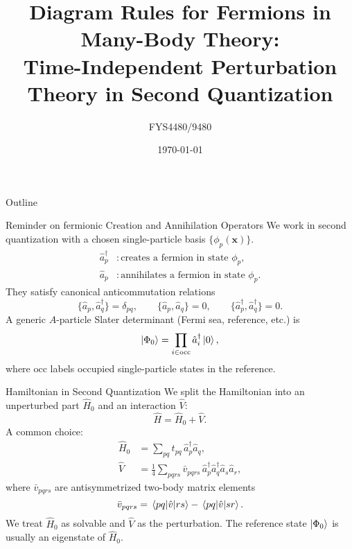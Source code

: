 \documentclass[aspectratio=169]{beamer}
\title[Diagram Rules for Fermions]{Diagram Rules for Fermions in Many-Body Theory:\\
Time-Independent Perturbation Theory in Second Quantization}
\author{FYS4480/9480}
\institute{Addition to lecture notes week 44}
\date{\today}
\begin{document}

\begin{frame}
    \titlepage
\end{frame}

\begin{frame}{Outline}
\tableofcontents
\end{frame}



\begin{frame}{Reminder on fermionic Creation and Annihilation Operators}
We work in second quantization with a chosen single-particle basis
$\{ \phi_p(\mathbf{x}) \}$.
\begin{align}
    \hat{a}^\dagger_p &: \text{creates a fermion in state } \phi_p, \\
    \hat{a}_p &: \text{annihilates a fermion in state } \phi_p.
\end{align}
They satisfy canonical anticommutation relations
\begin{equation}
    \{ \hat{a}_p, \hat{a}_q^\dagger \} = \delta_{pq}, \qquad
    \{ \hat{a}_p, \hat{a}_q \} = 0, \qquad
    \{ \hat{a}^\dagger_p, \hat{a}^\dagger_q \} = 0.
\end{equation}
A generic $A$-particle Slater determinant (Fermi sea, reference, etc.) is
\begin{equation}
    \ket{\Phi_0} = \prod_{i \in \text{occ}} \hat{a}^\dagger_i \ket{0},
\end{equation}
where $\text{occ}$ labels occupied single-particle states in the reference.
\end{frame}

\begin{frame}{Hamiltonian in Second Quantization}
We split the Hamiltonian into an unperturbed part $\hat{H}_0$ and an interaction $\hat{V}$:
\begin{equation}
    \hat{H} = \hat{H}_0 + \hat{V}.
\end{equation}
A common choice:
\begin{align}
    \hat{H}_0 &= \sum_{pq} t_{pq} \, \hat{a}^\dagger_p \hat{a}_q, \\
    \hat{V} &= \frac{1}{4} \sum_{pqrs} \bar{v}_{pqrs} \,
        \hat{a}^\dagger_p \hat{a}^\dagger_q \hat{a}_s \hat{a}_r,
\end{align}
where $\bar{v}_{pqrs}$ are antisymmetrized two-body matrix elements
\[
\bar{v}_{pqrs} = \matrixel{pq}{\hat{v}}{rs}
- \matrixel{pq}{\hat{v}}{sr}.
\]
We treat $\hat{H}_0$ as solvable and $\hat{V}$ as the perturbation.
The reference state $\ket{\Phi_0}$ is usually an eigenstate of $\hat{H}_0$.
\end{frame}
\end{document}
